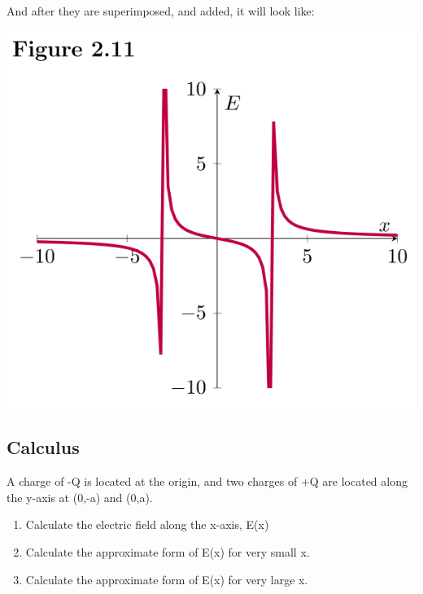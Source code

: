 \begin{solution}
\newpage
And after they are superimposed, and added, it will look like:

\begin{center}


\includegraphics{Figures/Figure211}
\end{center}

\end{solution}



\subsection*{Calculus}

\begin{question}
A charge of -Q is located at the origin, and two charges of +Q are located along the y-axis at (0,-a) and (0,a).

\begin{enumerate}[label=(\alph*)]
    \item Calculate the electric field along the x-axis, E(x)
    \item Calculate the approximate form of E(x) for very small x.
    \item Calculate the approximate form of E(x) for very large x.
\end{enumerate}
\end{question}

